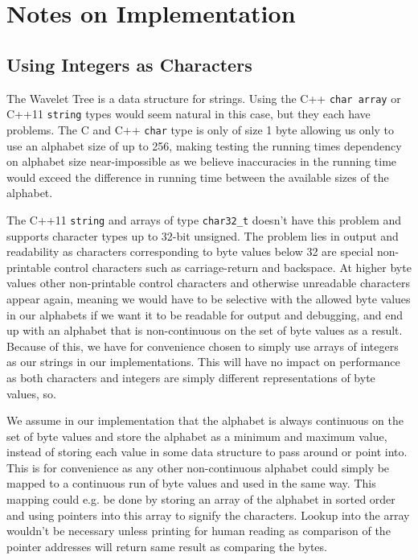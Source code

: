 \section{Notes on Implementation}

\subsection{Using Integers as Characters}
\label{sec:UsingIntAsChar}
The Wavelet Tree is a data structure for strings. 
Using the C++ \texttt{char array} or C++11 \texttt{string} types would seem natural in this case, but they each have problems.
The C and C++ \texttt{char} type is only of size 1 byte allowing us only to use an alphabet size of up to 256, making testing the running times dependency on alphabet size near-impossible as we believe inaccuracies in the running time would exceed the difference in running time between the available sizes of the alphabet.

The C++11 \texttt{string} and arrays of type \texttt{char32\_t} doesn't have this problem and supports character types up to 32-bit unsigned. 
The problem lies in output and readability as characters corresponding to byte values below 32 are special non-printable control characters such as carriage-return and backspace. 
At higher byte values other non-printable control characters and otherwise unreadable characters appear again, meaning we would have to be selective with the allowed byte values in our alphabets if we want it to be readable for output and debugging, and end up with an alphabet that is non-continuous on the set of byte values as a result.
Because of this, we have for convenience chosen to simply use arrays of integers as our strings in our implementations.
This will have no impact on performance as both characters and integers are simply different representations of byte values, so.

We assume in our implementation that the alphabet is always continuous on the set of byte values and store the alphabet as a minimum and maximum value, instead of storing each value in some data structure to pass around or point into.
This is for convenience as any other non-continuous alphabet could simply be mapped to a continuous run of byte values and used in the same way. 
This mapping could e.g. be done by storing an array of the alphabet in sorted order and using pointers into this array to signify the characters. 
Lookup into the array wouldn't be necessary unless printing for human reading as comparison of the pointer addresses will return same result as comparing the bytes.

